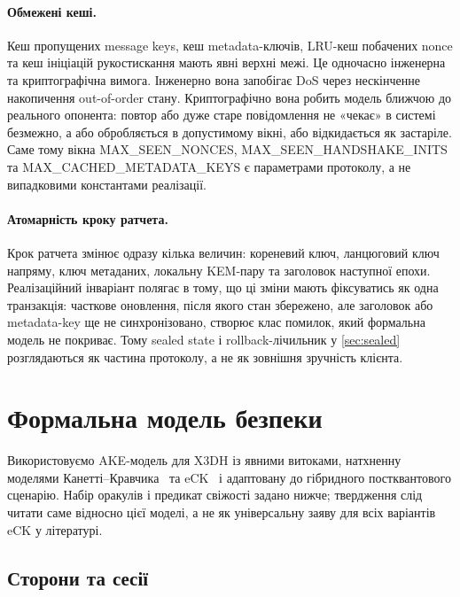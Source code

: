 \documentclass[11pt,a4paper]{article}
\theoremstyle{definition}
\newcommand{\eCK}{\textsf{eCK}}
\begin{document}
\paragraph{Обмежені кеші.}
Кеш пропущених message keys, кеш metadata-ключів, LRU-кеш побачених
nonce та кеш ініціацій рукостискання мають явні верхні межі. Це
одночасно інженерна та криптографічна вимога. Інженерно вона
запобігає DoS через нескінченне накопичення out-of-order стану.
Криптографічно вона робить модель ближчою до реального опонента:
повтор або дуже старе повідомлення не «чекає» в системі безмежно,
а або обробляється в допустимому вікні, або відкидається як застаріле.
Саме тому вікна \textsf{MAX\_SEEN\_NONCES},
\textsf{MAX\_SEEN\_HANDSHAKE\_INITS} та
\textsf{MAX\_CACHED\_METADATA\_KEYS} є параметрами протоколу, а не
випадковими константами реалізації.

\paragraph{Атомарність кроку ратчета.}
Крок ратчета змінює одразу кілька величин: кореневий ключ, ланцюговий
ключ напряму, ключ метаданих, локальну KEM-пару та заголовок наступної
епохи. Реалізаційний інваріант полягає в тому, що ці зміни мають
фіксуватись як одна транзакція: часткове оновлення, після якого стан
збережено, але заголовок або metadata-key ще не синхронізовано,
створює клас помилок, який формальна модель не покриває. Тому sealed
state і rollback-лічильник у \cref{sec:sealed} розглядаються як
частина протоколу, а не як зовнішня зручність клієнта.

\section{Формальна модель безпеки}\label{sec:model}

Використовуємо AKE-модель для X3DH із явними витоками, натхненну моделями
Канетті--Кравчика~\cite{canetti2001} та \eCK{}~\cite{lamacchia2007} і
адаптовану до гібридного постквантового сценарію. Набір оракулів і предикат
свіжості задано нижче; твердження слід читати саме відносно цієї моделі, а не
як універсальну заяву для всіх варіантів \eCK{} у літературі.

\subsection{Сторони та сесії}\label{sec:parties}
\end{document}
